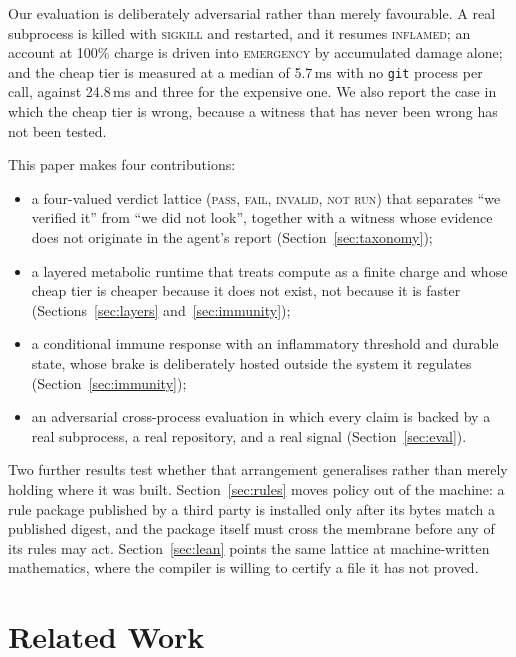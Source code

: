 \documentclass[conference]{IEEEtran}
\begin{document}
Our evaluation is deliberately adversarial rather than merely favourable. A real
subprocess is killed with \textsc{sigkill} and restarted, and it resumes
\textsc{inflamed}; an account at 100\% charge is driven into \textsc{emergency}
by accumulated damage alone; and the cheap tier is measured at a median of
5.7\,ms with no \texttt{git} process per call, against 24.8\,ms and three for the
expensive one. We also report the case in which the cheap tier is wrong, because
a witness that has never been wrong has not been tested.

This paper makes four contributions:
\begin{itemize}
  \item a four-valued verdict lattice (\textsc{pass}, \textsc{fail},
        \textsc{invalid}, \textsc{not run}) that separates ``we verified it'' from
        ``we did not look'', together with a witness whose evidence does not
        originate in the agent's report (Section~\ref{sec:taxonomy});
  \item a layered metabolic runtime that treats compute as a finite charge and
        whose cheap tier is cheaper because it does not exist, not because it is
        faster (Sections~\ref{sec:layers} and~\ref{sec:immunity});
  \item a conditional immune response with an inflammatory threshold and durable
        state, whose brake is deliberately hosted outside the system it regulates
        (Section~\ref{sec:immunity});
  \item an adversarial cross-process evaluation in which every claim is backed by
        a real subprocess, a real repository, and a real signal
        (Section~\ref{sec:eval}).
\end{itemize}

Two further results test whether that arrangement generalises rather than merely
holding where it was built. Section~\ref{sec:rules} moves policy out of the
machine: a rule package published by a third party is installed only after its
bytes match a published digest, and the package itself must cross the membrane
before any of its rules may act. Section~\ref{sec:lean} points the same lattice
at machine-written mathematics, where the compiler is willing to certify a file
it has not proved.

\section{Related Work}
\label{sec:related}
\end{document}
